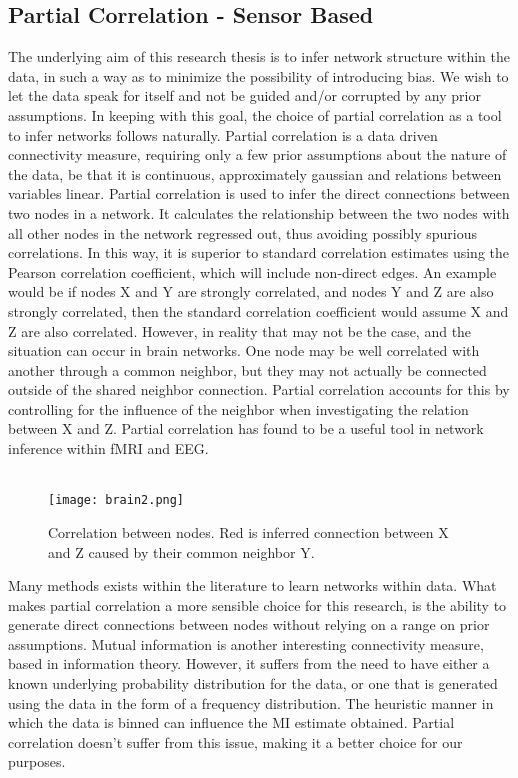 \documentclass[11pt]{article}
\begin{document}
\subsection{Partial Correlation - Sensor Based}
The underlying aim of this research thesis is to infer network structure within the data, in such a way as to minimize the possibility of introducing bias. We wish to let the data speak for itself and not be guided and/or corrupted by any prior assumptions. In keeping with this goal, the choice of partial correlation as a tool to infer networks follows naturally. Partial correlation is a data driven connectivity measure, requiring only a few prior assumptions about the nature of the data, be that it is continuous, approximately gaussian and relations between variables linear. Partial correlation is used to infer the direct connections between two nodes in a network. It calculates the relationship between the two nodes with all other nodes in the network regressed out, thus avoiding possibly spurious correlations. In this way, it is superior to standard correlation estimates using the Pearson correlation coefficient, which will include non-direct edges. An example would be if nodes X and Y are strongly correlated, and nodes Y and Z are also strongly correlated, then the standard correlation coefficient would assume X and Z are also correlated. However, in reality that may not be the case, and the situation can occur in brain networks. One node may be well correlated with another through a common neighbor, but they may not actually be connected outside of the shared neighbor connection. Partial correlation accounts for this by controlling for the influence of the neighbor when investigating the relation between X and Z. Partial correlation has found to be a useful tool in network inference within fMRI and EEG.\\
\\
\begin{figure}%
\centering\texttt{[image: brain2.png]}%
\caption{Correlation between nodes. Red is inferred connection between X and Z caused by their common neighbor Y.}
\label{b2}
\end{figure} 
Many methods exists within the literature to learn networks within data. What makes partial correlation a more sensible choice for this research, is the ability to generate direct connections between nodes without relying on a range on prior assumptions. Mutual information is another interesting connectivity measure, based in information theory. However, it suffers from the need to have either a known underlying probability distribution for the data, or one that is generated using the data in the form of a frequency distribution. The heuristic manner in which the data is binned can influence the MI estimate obtained. Partial correlation doesn't suffer from this issue, making it a better choice for our purposes.
\end{document}
